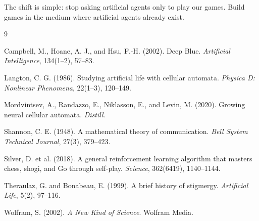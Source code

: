 \documentclass[11pt,a4paper]{article}
\theoremstyle{plain}
\theoremstyle{definition}
\begin{document}
The shift is simple: stop asking artificial agents only to play our games. Build games in the medium where artificial agents already exist.

\begin{thebibliography}{9}

Campbell, M., Hoane, A. J., and Hsu, F.-H. (2002).
\newblock Deep Blue.
\newblock \emph{Artificial Intelligence}, 134(1--2), 57--83.

Langton, C. G. (1986).
\newblock Studying artificial life with cellular automata.
\newblock \emph{Physica D: Nonlinear Phenomena}, 22(1--3), 120--149.

Mordvintsev, A., Randazzo, E., Niklasson, E., and Levin, M. (2020).
\newblock Growing neural cellular automata.
\newblock \emph{Distill}.

Shannon, C. E. (1948).
\newblock A mathematical theory of communication.
\newblock \emph{Bell System Technical Journal}, 27(3), 379--423.

Silver, D. et al. (2018).
\newblock A general reinforcement learning algorithm that masters chess, shogi, and Go through self-play.
\newblock \emph{Science}, 362(6419), 1140--1144.

Theraulaz, G. and Bonabeau, E. (1999).
\newblock A brief history of stigmergy.
\newblock \emph{Artificial Life}, 5(2), 97--116.

Wolfram, S. (2002).
\newblock \emph{A New Kind of Science}.
\newblock Wolfram Media.

\end{thebibliography}
\end{document}
